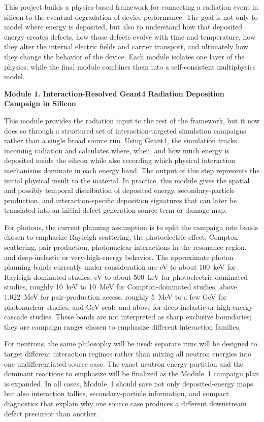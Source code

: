 \documentclass[11pt]{article}
\begin{document}
This project builds a physics-based framework for connecting a radiation event in silicon to the eventual degradation of device performance. The goal is not only to model where energy is deposited, but also to understand how that deposited energy creates defects, how those defects evolve with time and temperature, how they alter the internal electric fields and carrier transport, and ultimately how they change the behavior of the device. Each module isolates one layer of the physics, while the final module combines them into a self-consistent multiphysics model.

\textbf{Module 1. Interaction-Resolved Geant4 Radiation Deposition Campaign in Silicon}

This module provides the radiation input to the rest of the framework, but it now does so through a structured set of interaction-targeted simulation campaigns rather than a single broad source run. Using Geant4, the simulation tracks incoming radiation and calculates where, when, and how much energy is deposited inside the silicon while also recording which physical interaction mechanisms dominate in each energy band. The output of this step represents the initial physical insult to the material. In practice, this module gives the spatial and possibly temporal distribution of deposited energy, secondary-particle production, and interaction-specific deposition signatures that can later be translated into an initial defect-generation source term or damage map.

For photons, the current planning assumption is to split the campaign into bands chosen to emphasize Rayleigh scattering, the photoelectric effect, Compton scattering, pair production, photonuclear interactions in the resonance region, and deep-inelastic or very-high-energy behavior. The approximate photon planning bands currently under consideration are eV to about 100~keV for Rayleigh-dominated studies, eV to about 500~keV for photoelectric-dominated studies, roughly 10~keV to 10~MeV for Compton-dominated studies, above 1.022~MeV for pair-production access, roughly 5~MeV to a few GeV for photonuclear studies, and GeV-scale and above for deep-inelastic or high-energy cascade studies. These bands are not interpreted as sharp exclusive boundaries; they are campaign ranges chosen to emphasize different interaction families.

For neutrons, the same philosophy will be used: separate runs will be designed to target different interaction regimes rather than mixing all neutron energies into one undifferentiated source case. The exact neutron energy partition and the dominant reactions to emphasize will be finalized as the Module~1 campaign plan is expanded. In all cases, Module~1 should save not only deposited-energy maps but also interaction tallies, secondary-particle information, and compact diagnostics that explain why one source case produces a different downstream defect precursor than another.
\end{document}
